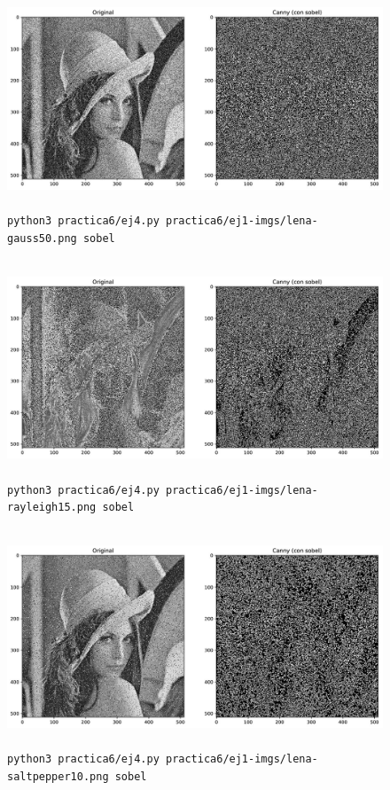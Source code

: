 \documentclass[11pt, spanish]{article}
\begin{document}
\begin{figure}[H]
\centering
    \includegraphics[height=6.5cm]{informe-imgs/ej4-sobel-lena-gauss50.jpg}
    \caption{\texttt{python3 practica6/ej4.py practica6/ej1-imgs/lena-gauss50.png sobel}}
\end{figure}

\begin{figure}[H]
\centering
    \includegraphics[height=6.5cm]{informe-imgs/ej4-sobel-lena-rayleigh15.jpg}
    \caption{\texttt{python3 practica6/ej4.py practica6/ej1-imgs/lena-rayleigh15.png sobel}}
\end{figure}

\begin{figure}[H]
\centering
    \includegraphics[height=6.5cm]{informe-imgs/ej4-sobel-lena-saltpepper10.jpg}
    \caption{\texttt{python3 practica6/ej4.py practica6/ej1-imgs/lena-saltpepper10.png sobel}}
\end{figure}
\end{document}
